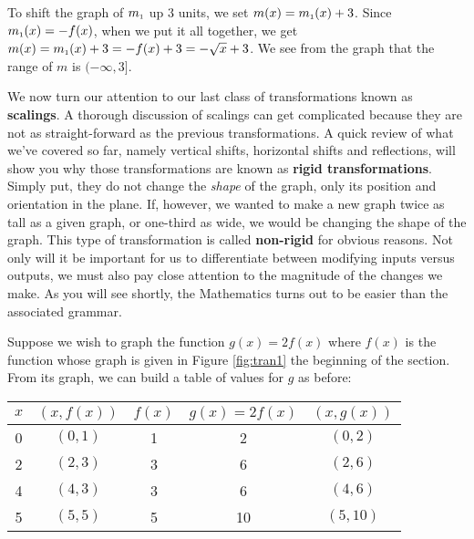 {\begin{enumerate}

To shift the graph of $m_{\mbox{\tiny$1$}}$ up $3$ units, we set $m(x) = m_{\mbox{\tiny$1$}}(x)+3$.  Since $m_{\mbox{\tiny$1$}}(x) = -f(x)$, when we put it all together, we get $m(x) = m_{\mbox{\tiny$1$}}(x)+3 = -f(x) + 3 = -\sqrt{x}+3$.   We see from the graph that the range of $m$ is $(-\infty, 3]$.


\end{enumerate}
}

\medskip

We now turn our attention to our last class of transformations known as \textbf{scalings}.  A thorough discussion of scalings can get complicated because they are not as straight-forward as the previous transformations.  A quick review of what we've covered so far, namely vertical shifts, horizontal shifts and reflections, will show you why those transformations are known as \textbf{rigid transformations}.  Simply put, they do not change the \emph{shape} of the graph, only its position and orientation in the plane.  If, however, we wanted to make a new graph twice as tall as a given graph, or one-third as wide, we would be changing the shape of the graph. This type of transformation is called \textbf{non-rigid} for obvious reasons.  Not only will it be important for us to differentiate between modifying inputs versus outputs, we must also pay close attention to the magnitude of the changes we make.  As you will see shortly, the Mathematics turns out to be easier than the associated grammar.

\smallskip

Suppose we wish to graph the function $g(x) =2 f(x)$ where $f(x)$ is the function whose graph is given in Figure \ref{fig:tran1} the beginning of the section. From its graph, we can build a table of values for $g$ as before: 

\begin{center}
\begin{tabular}{|c||c|c|c|c|}  

\hline

 $x$ & $(x,f(x))$ & $f(x)$ & $g(x)=2f(x)$ & $(x, g(x))$ \\ \hline
0 & $(0,1)$ & 1 &  2 &$(0, 2)$ \\  \hline
2 & $(2,3)$ & 3 &  6 &$(2,6)$ \\  \hline
4 & $(4,3)$ & 3 &  6 &$(4, 6)$ \\  \hline
5 & $(5,5)$ & 5 &  10&$( 5 ,10)$ \\  \hline
\end{tabular}
\end{center}


